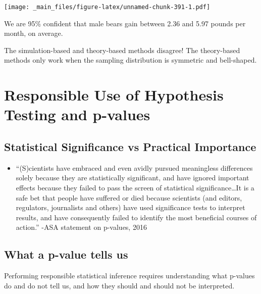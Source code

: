 \documentclass[]{book}
\providecommand{\tightlist}{%
  \setlength{\itemsep}{0pt}\setlength{\parskip}{0pt}}
\begin{document}
\texttt{[image: \_main\_files/figure-latex/unnamed-chunk-391-1.pdf]}

We are 95\% confident that male bears gain between 2.36 and 5.97 pounds
per month, on average.

The simulation-based and theory-based methods disagree! The theory-based
methods only work when the sampling distribution is symmetric and
bell-shaped.

\section{Responsible Use of Hypothesis Testing and
p-values}\label{responsible-use-of-hypothesis-testing-and-p-values}

\subsection{Statistical Significance vs Practical
Importance}\label{statistical-significance-vs-practical-importance}

\begin{itemize}
\tightlist
\item
  ``(S)cientists have embraced and even avidly pursued meaningless
  differences solely because they are statistically significant, and
  have ignored important effects because they failed to pass the screen
  of statistical significance\ldots{}It is a safe bet that people have
  suffered or died because scientists (and editors, regulators,
  journalists and others) have used significance tests to interpret
  results, and have consequently failed to identify the most beneficial
  courses of action.'' -ASA statement on p-values, 2016
\end{itemize}

\subsection{What a p-value tells us}\label{what-a-p-value-tells-us}

Performing responsible statistical inference requires understanding what
p-values do and do not tell us, and how they should and should not be
interpreted.
\end{document}
